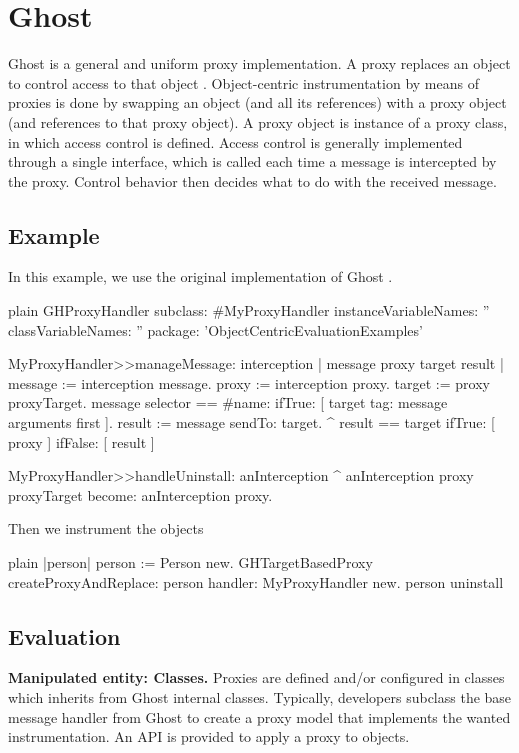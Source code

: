 \documentclass[10pt,twoside,english]{_support/latex/sbabook/sbabook}
\begin{document}
\frontmatter
\pagestyle{plain}

\tableofcontents*
\clearpage\listoffigures

\mainmatter

\chapter{Ghost}
Ghost is a general and uniform proxy implementation\cite{Mart14z}. A proxy replaces an object to control access to that object \cite{alpert1998design}. Object-centric instrumentation by means of proxies is done by swapping an object (and all its references) with a proxy object (and references to that proxy object). A proxy object is instance of a proxy class, in which access control is defined. Access control is generally implemented through a single interface, which is called each time a message is intercepted by the proxy. Control behavior then decides what to do with the received message.
\section{Example}
In this example, we use the original implementation of Ghost \cite{Mart14z}.

\begin{displaycode}{plain}
GHProxyHandler subclass: #MyProxyHandler
	instanceVariableNames: ''
	classVariableNames: ''
	package: 'ObjectCentricEvaluationExamples'

MyProxyHandler>>manageMessage: interception
	| message proxy target result |
	message := interception message.
	proxy := interception proxy.
	target := proxy proxyTarget.
	message selector == #name:
		ifTrue: [ target tag: message arguments first ].
	result := message sendTo: target.
	^ result == target
		ifTrue: [ proxy ]
		ifFalse: [ result ]

MyProxyHandler>>handleUninstall: anInterception
	^ anInterception proxy proxyTarget become: anInterception proxy.
\end{displaycode}

Then we instrument the objects

\begin{displaycode}{plain}
|person|
  person := Person new.
  GHTargetBasedProxy createProxyAndReplace: person handler: MyProxyHandler new.
  person uninstall
\end{displaycode}
\section{Evaluation}
\textbf{Manipulated entity: Classes.} Proxies are defined and/or configured in classes which inherits from Ghost internal classes. Typically, developers subclass the base message handler from Ghost to create a proxy model that implements the wanted instrumentation. An API is provided to apply a proxy to objects.
\end{document}
